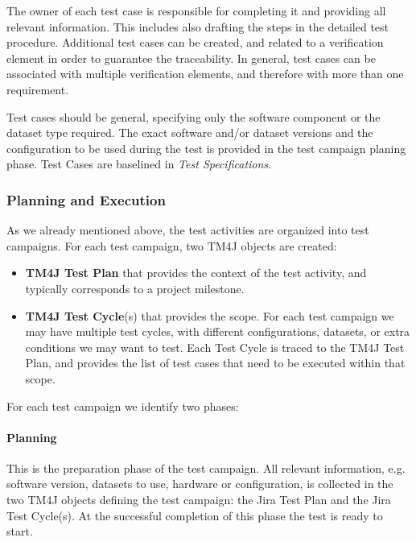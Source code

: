 The owner of each test case is responsible for completing it and providing all relevant information.
This includes also drafting the steps in the detailed test procedure.
Additional test cases can be created, and related to a verification element in order to guarantee the traceability.
In general, test cases can be associated with multiple verification elements, and therefore with more than one requirement.

Test cases should be general, specifying only the software component or the dataset type required.
The exact software and/or dataset versions and the configuration to be used during the test
is provided in the test campaign planing phase.
Test Cases are baselined in \textit{Test Specifications}.

\subsubsection{Planning and Execution}

As we already mentioned above, the test activities are organized into test campaigns.
For each test campaign, two TM4J objects are created:

\begin{itemize}
\item \textbf{TM4J Test Plan} that provides the context of the test activity, and typically corresponds to a project milestone.
\item \textbf{TM4J Test Cycle}(s) that provides the scope. For each test campaign we may have multiple test cycles,
with different configurations, datasets, or extra conditions we may want to test. Each Test Cycle is traced
to the TM4J Test Plan, and provides the list of test cases that need to be executed within that scope.
\end{itemize}

For each test campaign we identify two phases:

\paragraph{Planning}
This is the preparation phase of the test campaign. All relevant information, e.g. software version, datasets to use, 
hardware or configuration, is  collected in the two TM4J objects defining the test campaign:  the Jira Test Plan and the Jira Test Cycle(s).
At the successful completion of this phase the test is ready to start.

